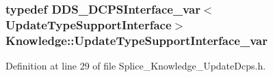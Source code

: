\hypertarget{namespaceKnowledge_a933872871f686a514362b32892d09283}{
\subsubsection[{UpdateTypeSupportInterface\_\-var}]{\setlength{\rightskip}{0pt plus 5cm}typedef DDS\_\-DCPSInterface\_\-var$<$ {\bf UpdateTypeSupportInterface}$>$ {\bf Knowledge::UpdateTypeSupportInterface\_\-var}}}
\label{da/d50/namespaceKnowledge_a933872871f686a514362b32892d09283}


Definition at line 29 of file Splice\_\-Knowledge\_\-UpdateDcps.h.

